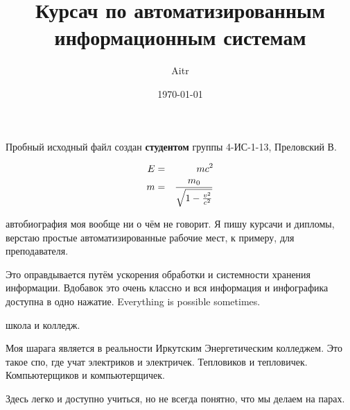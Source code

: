 \documentclass [12pt]{report}
\begin{document}
\title{Курсач по автоматизированным информационным системам} %
\date{\today} %
\maketitle
\author{Aitr}


\thispagestyle {headings}
Пробный исходный файл создан \textbf{студентом} группы 4-ИС-1-13, Преловский В.

  \begin{eqnarray}
    E &=& mc^2\\
\newline
    m &=& \frac{m_0}{\sqrt{1-\frac{v^2}{c^2}}}
 \end{eqnarray}

\newpage
{}
\thispagestyle{empty}
автобиография моя вообще ни о чём не говорит. Я пишу курсачи и дипломы, верстаю простые автоматизированные рабочие мест, к примеру, для преподавателя.

Это оправдывается путём ускорения обработки и системности хранения информации. Вдобавок это очень классно и вся информация и инфографика доступна в одно нажатие. Everything is possible sometimes.

\newpage
{}
школа и колледж.
\newsavebox{\fmbox}


Моя шарага является в реальности Иркутским Энергетическим колледжем. Это такое спо, где учат электриков и электричек. Тепловиков и тепловичек. Компьютерщиков и компьютерщичек.


 Здесь легко и доступно учиться, но не всегда понятно, что мы делаем на парах.
\end{document}
